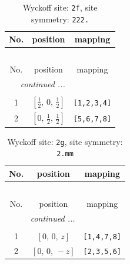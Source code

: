 \documentclass[fleqn,8pt]{jsarticle}
\begin{document}
\renewcommand{\arraystretch}{1.2}
\begin{longtable}{ccc}
\caption{Wyckoff site: {\tt 2f}, site symmetry: {\tt 222.}}
 \\
 \hline \hline
No. & position & mapping \\ \hline \endfirsthead

\multicolumn{2}{l}{\tablename\ \thetable{}} \\
 \hline \hline
No. & position & mapping \\ \hline \endhead

 \hline \hline
\multicolumn{2}{r}{\footnotesize\it continued ...} \\ \endfoot

 \hline \hline
\multicolumn{2}{r}{} \\ \endlastfoot

1 & $\left[ \frac{1}{2},\, 0,\, \frac{1}{2} \right]$ & {\tt [1,2,3,4]} \\ \hline
2 & $\left[ 0,\, \frac{1}{2},\, \frac{1}{2} \right]$ & {\tt [5,6,7,8]} \\
\end{longtable}
\renewcommand{\arraystretch}{1.2}
\begin{longtable}{ccc}
\caption{Wyckoff site: {\tt 2g}, site symmetry: {\tt 2.mm}}
 \\
 \hline \hline
No. & position & mapping \\ \hline \endfirsthead

\multicolumn{2}{l}{\tablename\ \thetable{}} \\
 \hline \hline
No. & position & mapping \\ \hline \endhead

 \hline \hline
\multicolumn{2}{r}{\footnotesize\it continued ...} \\ \endfoot

 \hline \hline
\multicolumn{2}{r}{} \\ \endlastfoot

1 & $\left[ 0,\, 0,\, z \right]$ & {\tt [1,4,7,8]} \\ \hline
2 & $\left[ 0,\, 0,\, - z \right]$ & {\tt [2,3,5,6]} \\
\end{longtable}
\renewcommand{\arraystretch}{1.2}
\end{document}
